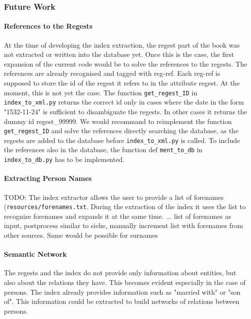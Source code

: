 \subsubsection{Future Work}
\paragraph{References to the Regests}
At the time of developing the index extraction, the regest part of the book was not extracted or written into the database yet. Once this is the case, the first expansion of the current code would be to solve the references to the regests. The references are already recognised and tagged with reg-ref. Each reg-ref is supposed to store the id of the regest it refers to in the attribute regest. At the moment, this is not yet the case. The function \texttt{get\_regest\_ID} in \texttt{index\_to\_xml.py} returns the correct id only in cases where the date in the form "1532-11-24" is sufficient to disambiguate the regests. In other cases it returns the dummy id regest\_99999. We would recommand to reimplement the function \texttt{get\_regest\_ID} and solve the references directly searching the database, as the regests are added to the database before \texttt{index\_to\_xml.py} is called. To include the references also in the database, the function def \texttt{ment\_to\_db} in \texttt{index\_to\_db.py} has to be implemented.

\paragraph{Extracting Person Names}
TODO: The index extractor allows the user to provide a list of forenames (\texttt{resources/forenames.txt}. During the extraction of the index it uses the list to recognize forenames and expands it at the same time. ...
list of forenames as input, postprocess similar to siehe, manually increment list with forenames from other sources. Same would be possible for surnames

\paragraph{Semantic Network}
The regests and the index do not provide only information about entities, but also about the relations they have. This becomes evident especially in the case of persons. The index already provides information such as "married with" or "son of". This information could be extracted to build networks of relations between persons.

